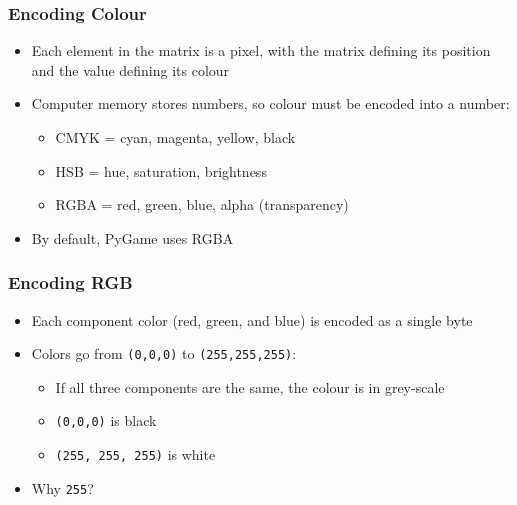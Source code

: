 \begin{frame}
	\frametitle{Encoding Colour}
	
	\begin{itemize}
		\item Each element in the matrix is a pixel, with the matrix defining its position and the value defining  its colour
		\item Computer memory stores numbers, so colour must be encoded into a number:
		\begin{itemize}
			\item CMYK = cyan, magenta, yellow, black
			\item HSB = hue, saturation, brightness
			\item RGBA = red, green, blue, alpha (transparency)
		\end{itemize}
		\item By default, PyGame uses RGBA
	\end{itemize}
\end{frame}

\begin{frame}
	\frametitle{Encoding RGB}
	
	\begin{itemize}
		\item Each component color (red, green, and blue) is encoded as a single byte
		\item Colors go from \lstinline{(0,0,0)} to \lstinline{(255,255,255)}:
		\begin{itemize}
			\item If all three components are the same, the colour is in grey-scale
			\item  \lstinline{(0,0,0)} is black
			\item  \lstinline{(255, 255, 255)} is white
		\end{itemize}
		\item Why \texttt{255}?
	\end{itemize}
\end{frame}


